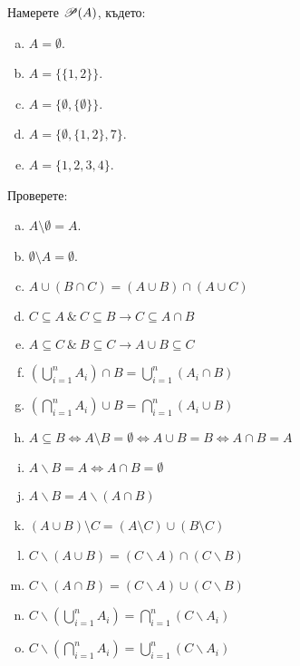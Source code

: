 \begin{problem}
  Намерете $\mathscr{P}(A)$, където:
  \begin{enumerate}[a)]
  \item
    $A= \emptyset$.
  \item
    $A= \{\{1,2\}\}$.
  \item
    $A= \{\emptyset, \{\emptyset\}\}$.
  \item
    $A= \{\emptyset, \{1,2\}, 7\}$.
  \item
    $A= \{1,2,3,4\}$.
  \end{enumerate}
\end{problem}

\begin{problem}
  Проверете:
  \begin{enumerate}[a)]
  \item
    $A\setminus \emptyset = A$. 
  \item
    $\emptyset\setminus A=\emptyset$. 
  \item
    $A\cup(B\cap C) = (A\cup B)\cap(A\cup C)$
  \item
    $C\subseteq A\ \&\ C\subseteq B \rightarrow C\subseteq A\cap B$
  \item
    $A\subseteq C\ \&\ B\subseteq C \rightarrow A\cup B\subseteq C$
  \item
    $(\bigcup^{n}_{i=1} A_i) \cap B = \bigcup^{n}_{i=1} (A_i \cap B)$
  \item
    $(\bigcap^{n}_{i=1} A_i) \cup B = \bigcap^{n}_{i=1} (A_i \cup B)$
  \item
    $A\subseteq B \iff A\setminus B = \emptyset \iff A\cup B = B \iff A\cap B = A$
  \item
    $A\backslash B = A \iff A\cap B = \emptyset$
  \item
    $A\backslash B = A\backslash (A\cap B)$
  \item
    $(A\cup B)\setminus C = (A\setminus C) \cup (B\setminus C)$
  \item
    $C\backslash (A\cup B) = (C\backslash A)\cap(C\backslash B)$
  \item
    $C \backslash (A\cap B) = (C\backslash A)\cup(C\backslash B)$
  \item
    $C\backslash(\bigcup^{n}_{i=1} A_i) = \bigcap^{n}_{i=1} (C\backslash A_i)$
  \item
    $C \backslash(\bigcap^{n}_{i=1} A_i) = \bigcup^{n}_{i=1} (C\backslash A_i)$

\end{enumerate}
\end{problem}
